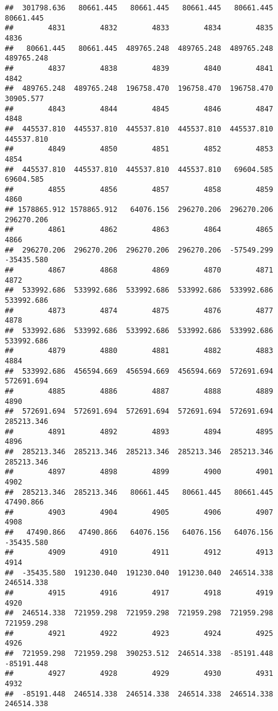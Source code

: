 \documentclass[
]{book}
\begin{document}
\begin{verbatim}
##  301798.636   80661.445   80661.445   80661.445   80661.445   80661.445 
##        4831        4832        4833        4834        4835        4836 
##   80661.445   80661.445  489765.248  489765.248  489765.248  489765.248 
##        4837        4838        4839        4840        4841        4842 
##  489765.248  489765.248  196758.470  196758.470  196758.470   30905.577 
##        4843        4844        4845        4846        4847        4848 
##  445537.810  445537.810  445537.810  445537.810  445537.810  445537.810 
##        4849        4850        4851        4852        4853        4854 
##  445537.810  445537.810  445537.810  445537.810   69604.585   69604.585 
##        4855        4856        4857        4858        4859        4860 
## 1578865.912 1578865.912   64076.156  296270.206  296270.206  296270.206 
##        4861        4862        4863        4864        4865        4866 
##  296270.206  296270.206  296270.206  296270.206  -57549.299  -35435.580 
##        4867        4868        4869        4870        4871        4872 
##  533992.686  533992.686  533992.686  533992.686  533992.686  533992.686 
##        4873        4874        4875        4876        4877        4878 
##  533992.686  533992.686  533992.686  533992.686  533992.686  533992.686 
##        4879        4880        4881        4882        4883        4884 
##  533992.686  456594.669  456594.669  456594.669  572691.694  572691.694 
##        4885        4886        4887        4888        4889        4890 
##  572691.694  572691.694  572691.694  572691.694  572691.694  285213.346 
##        4891        4892        4893        4894        4895        4896 
##  285213.346  285213.346  285213.346  285213.346  285213.346  285213.346 
##        4897        4898        4899        4900        4901        4902 
##  285213.346  285213.346   80661.445   80661.445   80661.445   47490.866 
##        4903        4904        4905        4906        4907        4908 
##   47490.866   47490.866   64076.156   64076.156   64076.156  -35435.580 
##        4909        4910        4911        4912        4913        4914 
##  -35435.580  191230.040  191230.040  191230.040  246514.338  246514.338 
##        4915        4916        4917        4918        4919        4920 
##  246514.338  721959.298  721959.298  721959.298  721959.298  721959.298 
##        4921        4922        4923        4924        4925        4926 
##  721959.298  721959.298  390253.512  246514.338  -85191.448  -85191.448 
##        4927        4928        4929        4930        4931        4932 
##  -85191.448  246514.338  246514.338  246514.338  246514.338  246514.338 

\end{verbatim}
\end{document}

